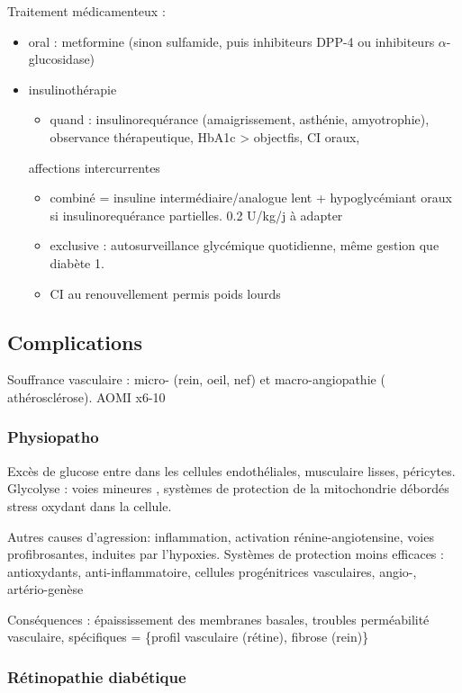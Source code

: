 \documentclass[11pt]{article}
\begin{document}
Traitement médicamenteux :
\begin{itemize}
\item oral : metformine (sinon sulfamide, puis inhibiteurs DPP-4 ou inhibiteurs
\(\alpha\)-glucosidase)
\item insulinothérapie 
\begin{itemize}
\item quand : insulinorequérance (amaigrissement, asthénie, amyotrophie), observance thérapeutique, HbA1c > objectfis, CI oraux,
\end{itemize}
affections intercurrentes
\begin{itemize}
\item combiné = insuline intermédiaire/analogue lent + hypoglycémiant oraux si
insulinorequérance partielles. 0.2 U/kg/j à adapter
\item exclusive : autosurveillance glycémique quotidienne, même gestion que
diabète 1.
\item CI au renouvellement permis poids lourds
\end{itemize}
\end{itemize}

\subsection{Complications}
\label{sec:orgadaf33b}
Souffrance vasculaire : micro- (rein, oeil, nef) et macro-angiopathie (\inc
athérosclérose). AOMI x6-10

\subsubsection{Physiopatho}
\label{sec:org57d049f}
Excès de glucose entre dans les cellules endothéliales, musculaire lisses, péricytes.
Glycolyse : voies mineures \inc, systèmes de protection de la mitochondrie
débordés \\
\thus stress oxydant dans la cellule.

Autres causes d'agression: inflammation, activation rénine-angiotensine, voies profibrosantes,
induites par l'hypoxies. Systèmes de protection moins efficaces : antioxydants,
anti-inflammatoire, cellules progénitrices vasculaires, angio-, artério-genèse

Conséquences : épaississement des membranes basales, troubles perméabilité
vasculaire, spécifiques = \{profil vasculaire (rétine), fibrose (rein)\}

\subsubsection{Rétinopathie diabétique}
\label{sec:org0fd0701}
\end{document}
